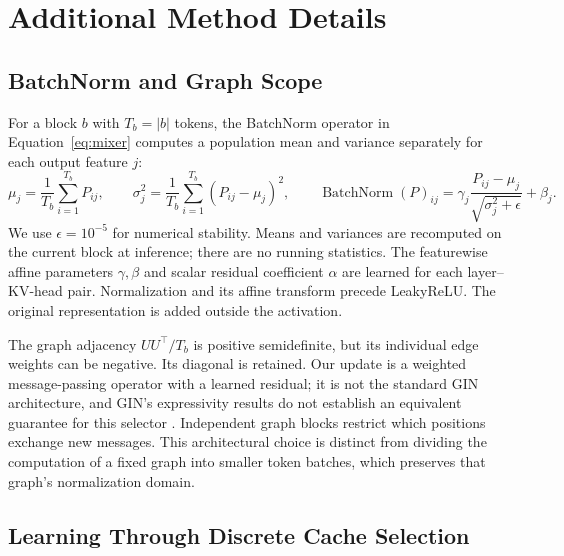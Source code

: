 \section{Additional Method Details}
\label{app:method}

\subsection{BatchNorm and Graph Scope}
\label{app:normalization}

For a block $b$ with $T_b=|b|$ tokens, the BatchNorm operator in Equation~\ref{eq:mixer} computes a population mean and variance separately for each output feature $j$:
\begin{equation}
    \mu_j=\frac{1}{T_b}\sum_{i=1}^{T_b}P_{ij},\qquad
    \sigma_j^2=\frac{1}{T_b}\sum_{i=1}^{T_b}(P_{ij}-\mu_j)^2,\qquad
    \operatorname{BatchNorm}(P)_{ij}=\gamma_j\frac{P_{ij}-\mu_j}{\sqrt{\sigma_j^2+\epsilon}}+\beta_j.
\end{equation}
We use $\epsilon=10^{-5}$ for numerical stability. Means and variances are recomputed on the current block at inference; there are no running statistics. The featurewise affine parameters $\gamma,\beta$ and scalar residual coefficient $\alpha$ are learned for each layer--KV-head pair. Normalization and its affine transform precede LeakyReLU. The original representation is added outside the activation.

The graph adjacency $UU^{\top}/T_b$ is positive semidefinite, but its individual edge weights can be negative. Its diagonal is retained. Our update is a weighted message-passing operator with a learned residual; it is not the standard GIN architecture, and GIN's expressivity results do not establish an equivalent guarantee for this selector \citep{xu2019gin}. Independent graph blocks restrict which positions exchange new messages. This architectural choice is distinct from dividing the computation of a fixed graph into smaller token batches, which preserves that graph's normalization domain.

\subsection{Learning Through Discrete Cache Selection}
\label{app:surrogate}

